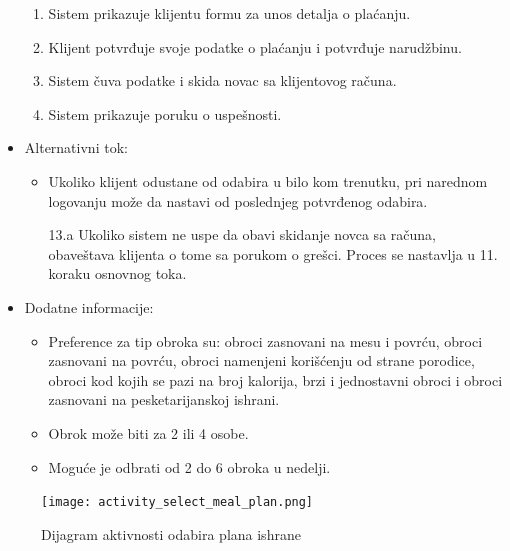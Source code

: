 \begin{itemize}
\begin{enumerate}
            \item Sistem prikazuje klijentu formu za unos detalja o plaćanju.
            \item Klijent potvrđuje svoje podatke o plaćanju i potvrđuje narudžbinu.
            \item Sistem čuva podatke i skida novac sa klijentovog računa.
            \item Sistem prikazuje poruku o uspešnosti. 
        \end{enumerate}
    \item Alternativni tok:
        \begin{itemize}
            \item Ukoliko klijent odustane od odabira u bilo kom trenutku, pri narednom logovanju može da nastavi od poslednjeg potvrđenog odabira.
            \item[13.a] Ukoliko sistem ne uspe da obavi skidanje novca sa računa, obaveštava klijenta o tome sa porukom o grešci. Proces se nastavlja u 11. koraku osnovnog toka.
        \end{itemize}
    \item Dodatne informacije:
        \begin{itemize}
            \item Preference za tip obroka su: obroci zasnovani na mesu i povrću, obroci zasnovani na povrću, obroci namenjeni korišćenju od strane porodice, obroci kod kojih se pazi na broj kalorija, brzi i jednostavni obroci i obroci zasnovani na pesketarijanskoj ishrani. 
            \item Obrok može biti za 2 ili 4 osobe.
            \item Moguće je odbrati od 2 do 6 obroka u nedelji.
        \end{itemize}
\end{itemize}

\begin{figure}[H]
\begin{center}
\texttt{[image: activity\_select\_meal\_plan.png]}
\end{center}
    \caption{Dijagram aktivnosti odabira plana ishrane}
\label{fig:ActivitySelectMealPlan}
\end{figure}

